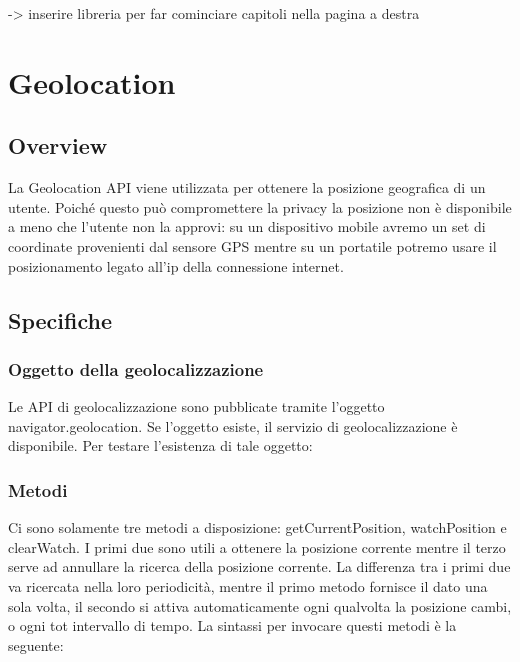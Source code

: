 \documentclass[11pt ,a4paper , twoside , openright ]{article}
\begin{document}
-> inserire libreria per far cominciare capitoli nella pagina a destra
\section{Geolocation}
\subsection{Overview}
La Geolocation API viene utilizzata per ottenere la posizione geografica di un utente. 
Poiché questo può compromettere la privacy la posizione non è disponibile a meno che l'utente non la approvi: su un dispositivo mobile avremo un set di coordinate provenienti dal sensore GPS mentre su un portatile potremo usare il posizionamento legato all’ip della connessione internet.

\subsection{Specifiche}

\subsubsection{Oggetto della geolocalizzazione}
Le API di geolocalizzazione sono pubblicate tramite l'oggetto navigator.geolocation. Se l'oggetto esiste, il servizio di geolocalizzazione è disponibile. Per testare l'esistenza di tale oggetto:


\subsubsection{Metodi}
Ci sono solamente tre metodi a disposizione: getCurrentPosition, watchPosition e clearWatch. I primi due sono utili a ottenere la posizione corrente mentre il terzo serve ad annullare la ricerca della posizione corrente. 
La differenza tra i primi due va ricercata nella loro periodicità, mentre il primo metodo fornisce il dato una sola volta, il secondo si attiva automaticamente ogni qualvolta la posizione cambi, o ogni tot intervallo di tempo.
La sintassi per invocare questi metodi è la seguente:

\end{document}
